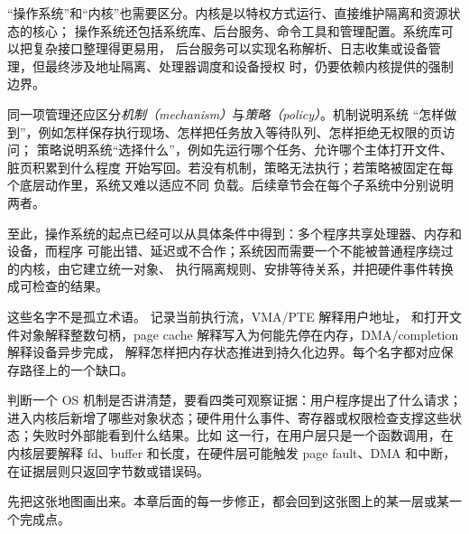 “操作系统”和“内核”也需要区分。内核是以特权方式运行、直接维护隔离和资源状态的核心；
操作系统还包括系统库、后台服务、命令工具和管理配置。系统库可以把复杂接口整理得更易用，
后台服务可以实现名称解析、日志收集或设备管理，但最终涉及地址隔离、处理器调度和设备授权
时，仍要依赖内核提供的强制边界。

同一项管理还应区分\emph{机制（mechanism）}与\emph{策略（policy）}。机制说明系统
“怎样做到”，例如怎样保存执行现场、怎样把任务放入等待队列、怎样拒绝无权限的页访问；
策略说明系统“选择什么”，例如先运行哪个任务、允许哪个主体打开文件、脏页积累到什么程度
开始写回。若没有机制，策略无法执行；若策略被固定在每个底层动作里，系统又难以适应不同
负载。后续章节会在每个子系统中分别说明两者。

至此，操作系统的起点已经可以从具体条件中得到：多个程序共享处理器、内存和设备，而程序
可能出错、延迟或不合作；系统因而需要一个不能被普通程序绕过的内核，由它建立统一对象、
执行隔离规则、安排等待关系，并把硬件事件转换成可检查的结果。

这些名字不是孤立术语。 记录当前执行流，VMA/PTE 解释用户地址， 和打开文件对象解释整数句柄，page cache 解释写入为何能先停在内存，DMA/completion 解释设备异步完成， 解释怎样把内存状态推进到持久化边界。每个名字都对应保存路径上的一个缺口。

判断一个 OS 机制是否讲清楚，要看四类可观察证据：用户程序提出了什么请求；进入内核后新增了哪些对象状态；硬件用什么事件、寄存器或权限检查支撑这些状态；失败时外部能看到什么结果。比如  这一行，在用户层只是一个函数调用，在内核层要解释 fd、buffer 和长度，在硬件层可能触发 page fault、DMA 和中断，在证据层则只返回字节数或错误码。

先把这张地图画出来。本章后面的每一步修正，都会回到这张图上的某一层或某一个完成点。

